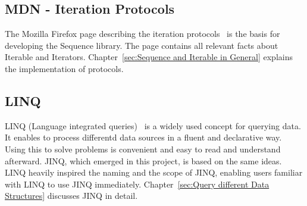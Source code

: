 \subsection{MDN - Iteration Protocols}
\label{sub:MDN - Iteration Protocols}
The Mozilla Firefox page describing the iteration
protocols~\cite{mdn_protocols} is the basis for developing the Sequence
library. The page contains all relevant facts about Iterable and Iterators.
Chapter~\ref{sec:Sequence and Iterable in General} explains the implementation
of protocols.

\subsection{LINQ}
\label{sub:LINQ}
LINQ (Language integrated queries)~\cite{billwagner_language-integrated_2023}
is a widely used concept for querying data. It enables to process differentd
data sources in a fluent and declarative way. Using this to solve problems is
convenient and easy to read and understand afterward. JINQ, which emerged in
this project, is based on the same ideas. LINQ heavily inspired the naming and
the scope of JINQ, enabling users familiar with LINQ to use JINQ immediately.
Chapter~\ref{sec:Query different Data Structures} discusses JINQ in detail.
